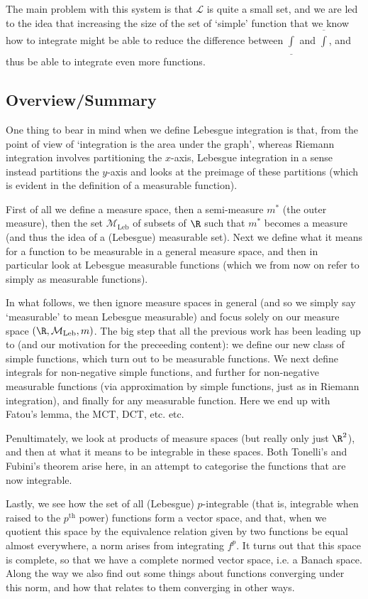 \documentclass{maths}
\newcommand{\mleb}{\mathcal{M}_{\text{Leb}}}
\begin{document}
The main problem with this system is that $\mathcal{L}$ is quite a small set, and we are led to the idea that increasing the size of the set of `simple' function that we know how to integrate might be able to reduce the difference between $\underline{\int}$ and $\overline{\int}$, and thus be able to integrate even more functions.

\subsection{Overview/Summary}

One thing to bear in mind when we define Lebesgue integration is that, from the point of view of `integration is the area under the graph', whereas Riemann integration involves partitioning the $x$-axis, Lebesgue integration in a sense instead partitions the $y$-axis and looks at the preimage of these partitions (which is evident in the definition of a measurable function).

First of all we define a measure space, then a semi-measure $m^*$ (the outer measure), then the set $\mleb$ of subsets of $\R$ such that $m^*$ becomes a measure (and thus the idea of a (Lebesgue) measurable set).
Next we define what it means for a function to be measurable in a general measure space, and then in particular look at Lebesgue measurable functions (which we from now on refer to simply as measurable functions).

In what follows, we then ignore measure spaces in general (and so we simply say `measurable' to mean Lebesgue measurable) and focus solely on our measure space $(\R,\mleb,m)$.
The big step that all the previous work has been leading up to (and our motivation for the preceeding content): we define our new class of simple functions, which turn out to be measurable functions. We next define integrals for non-negative simple functions, and further for non-negative measurable functions (via approximation by simple functions, just as in Riemann integration), and finally for any measurable function.
Here we end up with Fatou's lemma, the MCT, DCT, etc. etc.

Penultimately, we look at products of measure spaces (but really only just $\R^2$), and then at what it means to be integrable in these spaces.
Both Tonelli's and Fubini's theorem arise here, in an attempt to categorise the functions that are now integrable.

Lastly, we see how the set of all (Lebesgue) $p$-integrable (that is, integrable when raised to the $p^{\text{th}}$ power) functions form a vector space, and that, when we quotient this space by the equivalence relation given by two functions be equal almost everywhere, a norm arises from integrating $f^p$.
It turns out that this space is complete, so that we have a complete normed vector space, i.e. a Banach space.
Along the way we also find out some things about functions converging under this norm, and how that relates to them converging in other ways.
\end{document}
